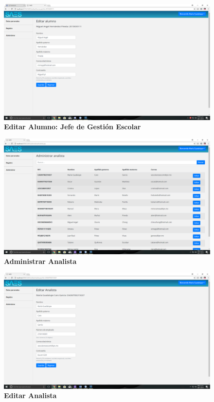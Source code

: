 \begin{figure}[H]
  \centering
    \includegraphics[scale=0.15]{project/images/55.png}
  \caption{\textbf{Editar Alumno: Jefe de Gestión Escolar}}
\end{figure}
\begin{figure}[H]
  \centering
    \includegraphics[scale=0.2]{project/images/23.png}
  \caption{\textbf{Administrar Analista}}
\end{figure}
\begin{figure}[H]
  \centering
    \includegraphics[scale=0.2]{project/images/24.png}
  \caption{\textbf{Editar Analista}}
\end{figure}
